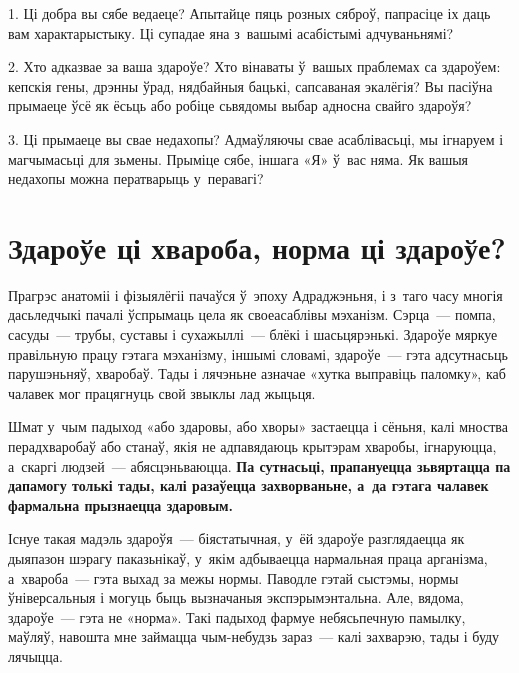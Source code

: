 1. Ці добра вы сябе ведаеце? Апытайце пяць розных сяброў, папрасіце іх даць вам характарыстыку. Ці супадае яна з~вашымі асабістымі адчуваньнямі?

2. Хто адказвае за ваша здароўе? Хто вінаваты ў~вашых праблемах са здароўем: кепскія гены, дрэнны ўрад, нядбайныя бацькі, сапсаваная экалёгія? Вы пасіўна прымаеце ўсё як ёсьць або робіце сьвядомы выбар адносна свайго здароўя?

3. Ці прымаеце вы свае недахопы? Адмаўляючы свае асаблівасьці, мы ігнаруем і магчымасьці для зьмены. Прыміце сябе, іншага «Я» ў~вас няма. Як вашыя недахопы можна ператварыць у~перавагі?


\section{Здароўе ці хвароба, норма ці здароўе?}


Прагрэс анатоміі і фізыялёгіі пачаўся ў~эпоху Адраджэньня, і з~таго часу многія дасьледчыкі пачалі ўспрымаць цела як своеасаблівы мэханізм. Сэрца~--- помпа, сасуды~--- трубы, суставы і сухажыллі~--- блёкі і шасьцярэнькі. Здароўе мяркуе правільную працу гэтага мэханізму, іншымі словамі, здароўе~--- гэта адсутнасьць парушэньняў, хваробаў. Тады і лячэньне азначае «хутка выправіць паломку», каб чалавек мог працягнуць свой звыклы лад жыцьця.


Шмат у~чым падыход «або здаровы, або хворы» застаецца і сёньня, калі мноства перадхваробаў або станаў, якія не адпавядаюць крытэрам хваробы, ігнаруюцца, а~скаргі людзей~--- абясцэньваюцца. \textbf{Па сутнасьці, прапануецца зьвяртацца па дапамогу толькі тады, калі разаўецца захворваньне, а~да гэтага чалавек фармальна прызнаецца здаровым.}


Існуе такая мадэль здароўя~--- біястатычная, у~ёй здароўе разглядаецца як дыяпазон шэрагу паказьнікаў, у~якім адбываецца нармальная праца арганізма, а~хвароба~--- гэта выхад за межы нормы. Паводле гэтай сыстэмы, нормы ўніверсальныя і могуць быць вызначаныя экспэрымэнтальна. Але, вядома, здароўе~--- гэта не «норма». Такі падыход фармуе небясьпечную памылку, маўляў, навошта мне займацца чым-небудзь зараз~--- калі захварэю, тады і буду лячыцца.

